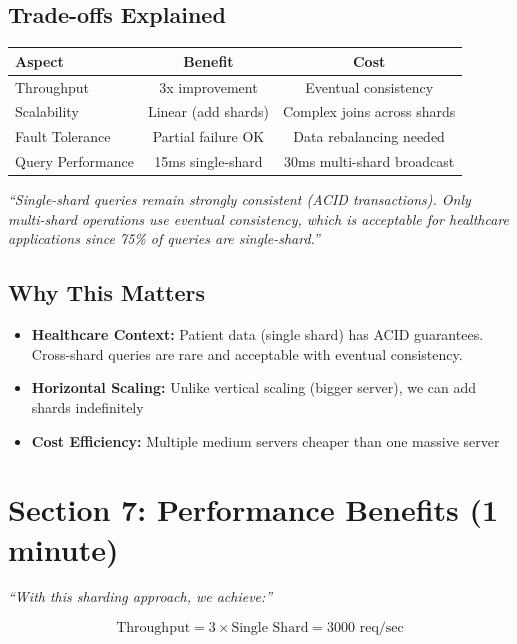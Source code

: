 \documentclass[12pt]{article}
\begin{document}
\subsection*{Trade-offs Explained}

\begin{table}[h]
\centering
\begin{tabular}{|l|c|c|}
\hline
\textbf{Aspect} & \textbf{Benefit} & \textbf{Cost} \\
\hline
Throughput & 3x improvement & Eventual consistency \\
Scalability & Linear (add shards) & Complex joins across shards \\
Fault Tolerance & Partial failure OK & Data rebalancing needed \\
Query Performance & 15ms single-shard & 30ms multi-shard broadcast \\
\hline
\end{tabular}
\end{table}

\textit{``Single-shard queries remain strongly consistent (ACID transactions). Only multi-shard operations use eventual consistency, which is acceptable for healthcare applications since 75\% of queries are single-shard.''}

\subsection*{Why This Matters}

\begin{itemize}
    \item \textbf{Healthcare Context:} Patient data (single shard) has ACID guarantees. Cross-shard queries are rare and acceptable with eventual consistency.
    \item \textbf{Horizontal Scaling:} Unlike vertical scaling (bigger server), we can add shards indefinitely
    \item \textbf{Cost Efficiency:} Multiple medium servers cheaper than one massive server
\end{itemize}

\section{Section 7: Performance Benefits (1 minute)}

\textit{``With this sharding approach, we achieve:''}

$$\text{Throughput} = 3 \times \text{Single Shard} = 3000 \text{ req/sec}$$
\end{document}
